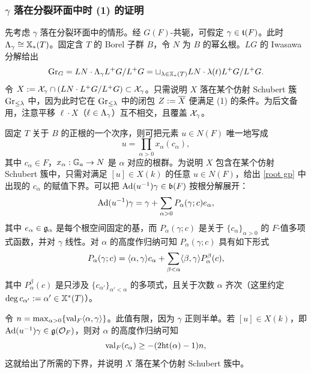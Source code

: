 \subsubsection{$\gamma$ 落在分裂环面中时 (1) 的证明}\label{sss:split case} 先考虑 $\gamma$ 落在分裂环面中的情形。经 $G(F)$-共轭，可假定 $\gamma\in\mathfrak{t}(F)$。此时 $\Lambda_{\gamma}\cong\mathbb{X}_*(T)$。固定含 $T$ 的 Borel 子群 $B$，令 $N$ 为 $B$ 的幂幺根。$LG$ 的 Iwasawa 分解给出
\begin{equation*}
\textup{Gr}_{G}=LN\cdot \Lambda_{\gamma}L^{+}G/L^{+}G=\sqcup_{\lambda\in\mathbb{X}_*(T)}LN\cdot \lambda(t)L^{+}G/L^{+}G.
\end{equation*}
令 $X:=\mathcal{X}_{\gamma}\cap (LN\cdot L^{+}G/L^{+}G)\subset \mathcal{X}_{\gamma}$。只需说明 $X$ 落在某个仿射 Schubert 簇 $\textup{Gr}_{\leq \lambda}$ 中，因为此时它在 $\textup{Gr}_{\leq\lambda}$ 中的闭包 $Z:=\overline{X}$ 便满足 (1) 的条件。为后文备用，注意平移 $\ell\cdot X$（$\ell\in \Lambda_{\gamma}$）互不相交，且覆盖 $\mathcal{X}_{\gamma}$。

固定 $T$ 关于 $B$ 的正根的一个次序，则可把元素 $u\in N(F)$ 唯一地写成
\begin{equation}\label{root gp}
u=\prod_{\alpha>0}x_{\alpha}(c_{\alpha}),
\end{equation}
其中 $c_{\alpha}\in F$，$x_{\alpha}: \mathbb{G}_a\to N$ 是 $\alpha$ 对应的根群。为说明 $X$ 包含在某个仿射 Schubert 簇中，只需对满足 $[u]\in X(k)$ 的任意 $u\in N(F)$，给出 \eqref{root gp} 中出现的 $c_{\alpha}$ 的赋值下界。可以把 $\textup{Ad}(u^{-1})\gamma\in\mathfrak{b}(F)$ 按根分解展开：
\begin{equation*}
\textup{Ad}(u^{-1})\gamma=\gamma+\sum_{\alpha>0}P_{\alpha}(\gamma; c)e_{\alpha},
\end{equation*}
其中 $e_{\alpha}\in\mathfrak{g}_{\alpha}$ 是每个根空间固定的基，而 $P_{\alpha}(\gamma;c)$ 是关于 $\{c_{\alpha}\}_{\alpha>0}$ 的 $F$-值多项式函数，并对 $\gamma$ 线性。对 $\alpha$ 的高度作归纳可知 $P_{\alpha}(\gamma;c)$ 具有如下形式
\begin{equation}\label{conj u gamma}
P_{\alpha}(\gamma;c)=\langle{\alpha,\gamma}\rangle c_{\alpha}+\sum_{\beta<\alpha}\langle{\beta,\gamma}\rangle P^{\beta}_{\alpha}(c),
\end{equation}
其中 $P^{\beta}_{\alpha}(c)$ 是只涉及 $\{c_{\alpha'}\}_{\alpha'<\alpha}$ 的多项式，且关于次数 $\alpha$ 齐次（这里约定 $\deg c_{\alpha'}:=\alpha'\in\mathbb{X}^*(T)$）。

令 $n=\max_{\alpha>0}\{\textup{val}_{F}\langle{\alpha,\gamma}\rangle\}$。此值有限，因为 $\gamma$ 正则半单。若 $[u]\in X(k)$，即 $\textup{Ad}(u^{-1})\gamma\in\mathfrak{g}(\mathcal{O}_{F})$，则对 $\alpha$ 的高度作归纳可知
\begin{equation*}
\textup{val}_{F}(c_{\alpha})\geq -(2\textup{ht}(\alpha)-1)n,
\end{equation*}
这就给出了所需的下界，并说明 $X$ 落在某个仿射 Schubert 簇中。


